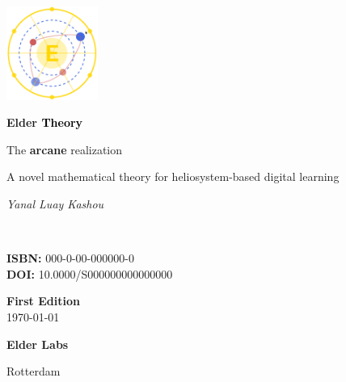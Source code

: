 \documentclass[11pt,twoside]{book}
\begin{document}
\frontmatter

\begin{titlepage}
    \centering
    \vspace*{0.5cm}
    \includegraphics[width=3cm]{figures/elder_symbol.pdf}
    \vspace{0.5cm}
    
    {\Huge\bfseries \textcolor{DarkSkyBlue}{Elder }\textrm{\textcolor{black}{Theory}}\par}
    \vspace{0.8cm}
    {\Large The \textcolor{DarkSkyBlue}{\textbf{arcane}} realization\par}
    \vspace{0.3cm}
    {\large A novel mathematical theory for heliosystem-based digital learning\par}
    
    \vspace{3cm}
    {\Large\itshape Yanal Luay Kashou\par}
\    
    \vfill
    
    \begin{minipage}{0.4\textwidth}
        \begin{flushleft}
            \textbf{ISBN:} 000-0-00-000000-0 \\
            \textbf{DOI:} 10.0000/S000000000000000
        \end{flushleft}
    \end{minipage}%
    \begin{minipage}{0.4\textwidth}
        \begin{flushright}
            \textbf{First Edition} \\
            \today
        \end{flushright}
    \end{minipage}
    
    \vspace{1cm}
    {\large \textbf{Elder Labs}\par}
    {\small Rotterdam\par}
\end{titlepage}
\end{document}
